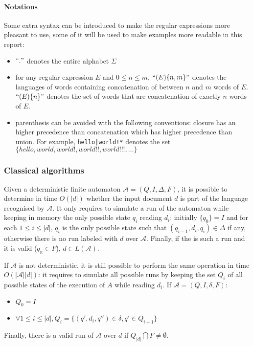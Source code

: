 \documentclass[12px]{article}
\begin{document}
        \paragraph{Notations} Some extra syntax can be introduced to make the
        regular expressions more pleasant to use, some of it will be used to
        make examples more readable in this report:
        \begin{itemize}
          \item $``."$ denotes the entire alphabet $\Sigma$
          \item for any regular expression $E$ and $0 \leq n \leq m$,
            $``(E)\{n,m\}"$ denotes the languages of words containing
            concatenation of between $n$ and $m$ words of $E$. $``(E)\{n\}"$
            denotes the set of words that are concatenation of exactly $n$
            words of $E$.
          \item parenthesis can be avoided with the following conventions:
            closure has an higher precedence than concatenation which has
            higher precedence than union. For example, \texttt{hello|world!*}
            denotes the set $\{hello, world, world!, world!!, world!!!,
            \ldots\}$
        \end{itemize}

      \subsubsection{Classical algorithms}

        Given a deterministic finite automaton $\mathcal{A} = (Q, I, \Delta,
        F)$, it is possible to determine in time $O(|d|)$ whether the input
        document $d$ is part of the language recognised by $\mathcal{A}$. It
        only requires to simulate a run of the automaton while keeping in
        memory the only possible state $q_i$ reading $d_i$: initially $\{q_0\}
        = I$ and for each $1 \leq i \leq |d|$, $q_{i}$ is the only possible
        state such that $(q_{i-1}, d_i, q_i) \in \Delta$ if any, otherwise
        there is no run labeled with $d$ over $\mathcal{A}$. Finally, if the is
        such a run and it is valid ($q_n \in F$), $d \in L(\mathcal{A})$.

        If $\mathcal{A}$ is not deterministic, it is still possible to perform
        the same operation in time $O(|\mathcal{A}| |d|)$: it requires to
        simulate all possible runs by keeping the set $Q_i$ of all possible
        states of the execution of $A$ while reading $d_i$. If $\mathcal{A} =
        (Q, I, \delta, F)$:
        \begin{itemize}
          \item $Q_0 = I$
          \item $\forall 1 \leq i \leq |d|, Q_i = \{(q', d_i, q'') \in \delta,
            q' \in Q_{i-1}\}$
        \end{itemize}
        Finally, there is a valid run of $\mathcal{A}$ over $d$ if $Q_{|d|}
        \bigcap F \neq \emptyset$.
\end{document}
